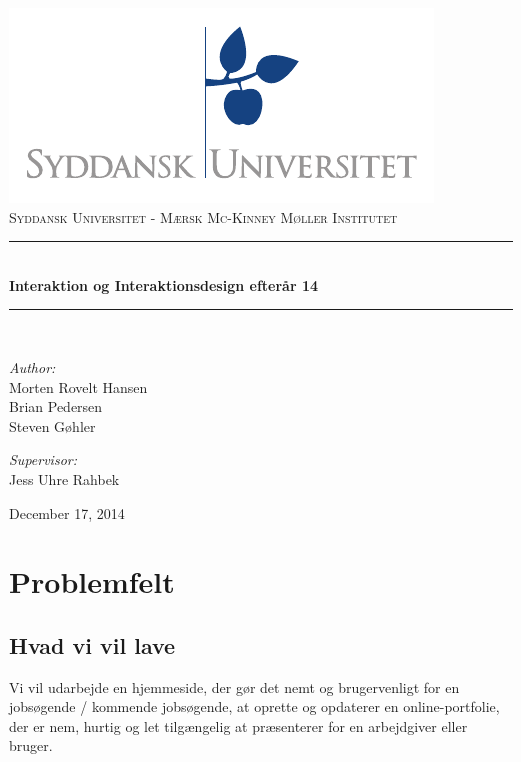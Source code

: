\documentclass[a4paper,titlepage,fleqn,12pt]{article}
\begin{document}
\begin{titlepage}
	\begin{center}
	\includegraphics[scale=1.5,page=7]{sdu_logos.pdf}~\\[0.5cm]
	\textsc{\Large{Syddansk Universitet - Mærsk Mc-Kinney Møller Institutet}} \\[0.2cm]
	\rule{12cm}{1pt} \\[0.4cm]
	{ \huge \bfseries Interaktion og Interaktionsdesign efterår 14 \\[0.4cm] }
	\rule{12cm}{1pt} \\[1.5cm]
	
	\begin{minipage}{0.4\textwidth}
		\begin{flushleft} \large
			\textit{Author:}\\
			Morten Rovelt Hansen\\
			Brian Pedersen\\
			Steven Gøhler\\
		\end{flushleft}
	\end{minipage}
	\begin{minipage}{0.4\textwidth}
		\begin{flushright} \large
			\textit{Supervisor:} \\
			Jess Uhre Rahbek
		\end{flushright}
	\end{minipage}
	
	\vfill
	
	{\large December 17, 2014}
	\end{center}
	\newpage
\end{titlepage}

\tableofcontents
\newpage

\section{Problemfelt}

\subsection{Hvad vi vil lave}
Vi vil udarbejde en hjemmeside, der gør det nemt og brugervenligt for en jobsøgende / kommende jobsøgende, at oprette og opdaterer en online-portfolie, der er nem, hurtig og let tilgængelig at præsenterer for en arbejdgiver eller bruger.
\end{document}
